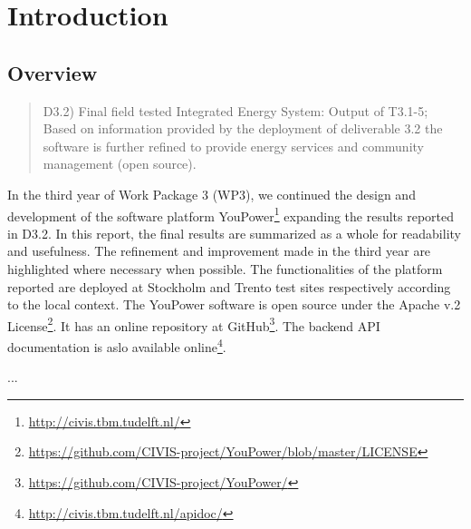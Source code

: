 
\section{Introduction}

\subsection{Overview}

\begin{quote}
D3.2) Final field tested Integrated Energy System: Output of T3.1-5; Based on information provided by the deployment of deliverable 3.2 the software is further refined to provide energy services and community management (open source). 
\end{quote}

In the third year of Work Package 3 (WP3), we continued the design and development of the software platform YouPower\footnote{ \url{http://civis.tbm.tudelft.nl/}} expanding the results reported in D3.2. In this report, the final results are summarized as a whole for readability and usefulness. The refinement and improvement made in the third year are highlighted where necessary when possible. 
% 
The functionalities of the platform reported are deployed at Stockholm and Trento test sites respectively according to the local context. The YouPower software is open source under the Apache v.2 License\footnote{\url{https://github.com/CIVIS-project/YouPower/blob/master/LICENSE}}. It has  an online repository at GitHub\footnote{ \url{https://github.com/CIVIS-project/YouPower/}}. 
The backend API documentation is aslo available online\footnote{ \url{http://civis.tbm.tudelft.nl/apidoc/}}. 

...


